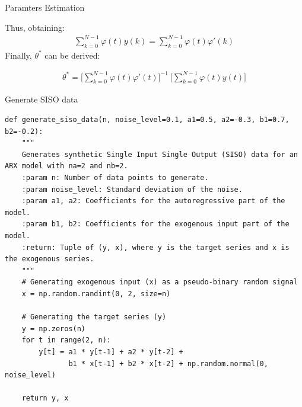 \documentclass[aspectratio=169,hyperref={pdfpagelabels=false}]{beamer}
\begin{document}
\begin{frame}{Paramters Estimation}
  \begin{block}{}
    Thus, obtaining: 
\begin{align*}
  \sum_{k=0}^{N-1}\varphi(t)y(k) = \sum_{k=0}^{N-1}\varphi(t)\varphi'(k)
\end{align*}
Finally, $\theta^*$ can be derived: 
\begin{center}
\begin{tcolorbox}[width=0.6\linewidth, height = 0.22\linewidth, colframe=red]
    \begin{align*}
      \theta^* = \Biggr[\sum_{k=0}^{N-1}\varphi(t)\varphi'(t)\Biggr]^{-1} \: \Biggr[\sum_{k=0}^{N-1}\varphi(t)y(t)\Biggr]
    \end{align*}
\end{tcolorbox}
\end{center}
\end{block}
\end{frame}

\begin{frame}[fragile]{\small{Generate SISO data}}
  \begin{verbatim}
def generate_siso_data(n, noise_level=0.1, a1=0.5, a2=-0.3, b1=0.7, b2=-0.2):
    """
    Generates synthetic Single Input Single Output (SISO) data for an ARX model with na=2 and nb=2.
    :param n: Number of data points to generate.
    :param noise_level: Standard deviation of the noise.
    :param a1, a2: Coefficients for the autoregressive part of the model.
    :param b1, b2: Coefficients for the exogenous input part of the model.
    :return: Tuple of (y, x), where y is the target series and x is the exogenous series.
    """
    # Generating exogenous input (x) as a pseudo-binary random signal
    x = np.random.randint(0, 2, size=n)

    # Generating the target series (y)
    y = np.zeros(n)
    for t in range(2, n):
        y[t] = a1 * y[t-1] + a2 * y[t-2] +
               b1 * x[t-1] + b2 * x[t-2] + np.random.normal(0, noise_level)

    return y, x
  \end{verbatim}
\end{frame}
\end{document}
